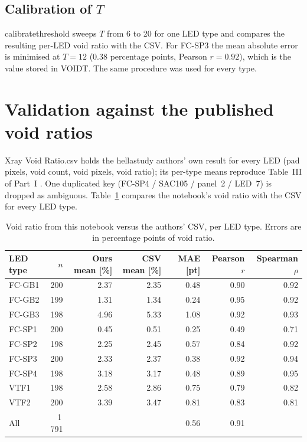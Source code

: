 \documentclass[11pt,a4paper]{article}
\newcommand{\code}[1]{{\ttfamily\def\_{\textunderscore\allowbreak}#1}}
\begin{document}
\subsection{Calibration of \texorpdfstring{$T$}{T}}

\code{calibrate\_threshold} sweeps $T$ from 6 to 20 for one LED type and compares the resulting
per-LED void ratio with the CSV. For FC-SP3 the mean absolute error is minimised at $T = 12$
(0.38 percentage points, Pearson $r = 0.92$), which is the value stored in \code{VOID\_T}. The
same procedure was used for every type.

\section{Validation against the published void ratios}
\label{sec:validation}

\code{Xray Void Ratio.csv} holds the hellastudy authors' own result for every LED (pad pixels,
void count, void pixels, void ratio); its per-type means reproduce Table~III of Part~I
\cite{part1}. One duplicated key (FC-SP4 / SAC105 / panel~2 / LED~7) is dropped as ambiguous.
Table~\ref{tab:validation} compares the notebook's void ratio with the CSV for every LED type.

\begin{table}[H]
\centering
\caption{Void ratio from this notebook versus the authors' CSV, per LED type.
Errors are in percentage points of void ratio.}
\label{tab:validation}
\small
\begin{tabular}{lrrrrrr}
\toprule
LED type & $n$ & Ours mean [\%] & CSV mean [\%] & MAE [pt] & Pearson $r$ & Spearman $\rho$ \\
\midrule
FC-GB1 & 200 & 2.37 & 2.35 & 0.48 & 0.90 & 0.92 \\
FC-GB2 & 199 & 1.31 & 1.34 & 0.24 & 0.95 & 0.92 \\
FC-GB3 & 198 & 4.96 & 5.33 & 1.08 & 0.92 & 0.93 \\
FC-SP1 & 200 & 0.45 & 0.51 & 0.25 & 0.49 & 0.71 \\
FC-SP2 & 198 & 2.25 & 2.45 & 0.57 & 0.84 & 0.92 \\
FC-SP3 & 200 & 2.33 & 2.37 & 0.38 & 0.92 & 0.94 \\
FC-SP4 & 198 & 3.18 & 3.17 & 0.48 & 0.89 & 0.95 \\
VTF1   & 198 & 2.58 & 2.86 & 0.75 & 0.79 & 0.82 \\
VTF2   & 200 & 3.39 & 3.47 & 0.81 & 0.83 & 0.81 \\
\midrule
All    & 1\,791 & \multicolumn{2}{c}{} & 0.56 & 0.91 & \\
\bottomrule
\end{tabular}
\end{table}
\end{document}
